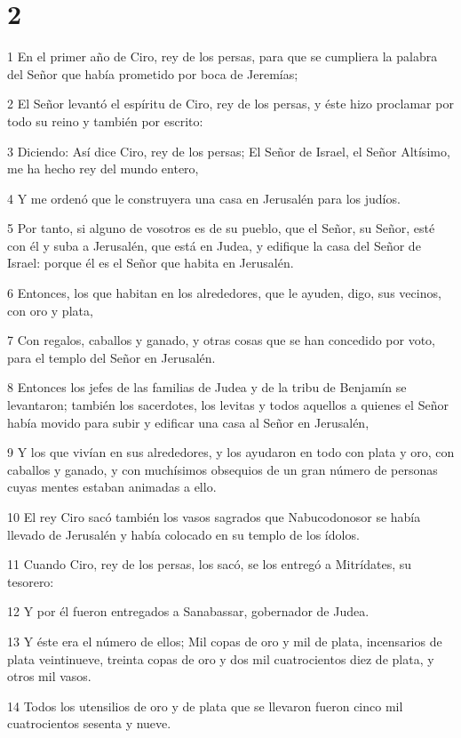 \chapter{2}

\par 1 En el primer año de Ciro, rey de los persas, para que se cumpliera la palabra del Señor que había prometido por boca de Jeremías;
\par 2 El Señor levantó el espíritu de Ciro, rey de los persas, y éste hizo proclamar por todo su reino y también por escrito:
\par 3 Diciendo: Así dice Ciro, rey de los persas; El Señor de Israel, el Señor Altísimo, me ha hecho rey del mundo entero,
\par 4 Y me ordenó que le construyera una casa en Jerusalén para los judíos.
\par 5 Por tanto, si alguno de vosotros es de su pueblo, que el Señor, su Señor, esté con él y suba a Jerusalén, que está en Judea, y edifique la casa del Señor de Israel: porque él es el Señor que habita en Jerusalén.
\par 6 Entonces, los que habitan en los alrededores, que le ayuden, digo, sus vecinos, con oro y plata,
\par 7 Con regalos, caballos y ganado, y otras cosas que se han concedido por voto, para el templo del Señor en Jerusalén.
\par 8 Entonces los jefes de las familias de Judea y de la tribu de Benjamín se levantaron; también los sacerdotes, los levitas y todos aquellos a quienes el Señor había movido para subir y edificar una casa al Señor en Jerusalén,
\par 9 Y los que vivían en sus alrededores, y los ayudaron en todo con plata y oro, con caballos y ganado, y con muchísimos obsequios de un gran número de personas cuyas mentes estaban animadas a ello.
\par 10 El rey Ciro sacó también los vasos sagrados que Nabucodonosor se había llevado de Jerusalén y había colocado en su templo de los ídolos.
\par 11 Cuando Ciro, rey de los persas, los sacó, se los entregó a Mitrídates, su tesorero:
\par 12 Y por él fueron entregados a Sanabassar, gobernador de Judea.
\par 13 Y éste era el número de ellos; Mil copas de oro y mil de plata, incensarios de plata veintinueve, treinta copas de oro y dos mil cuatrocientos diez de plata, y otros mil vasos.
\par 14 Todos los utensilios de oro y de plata que se llevaron fueron cinco mil cuatrocientos sesenta y nueve.
